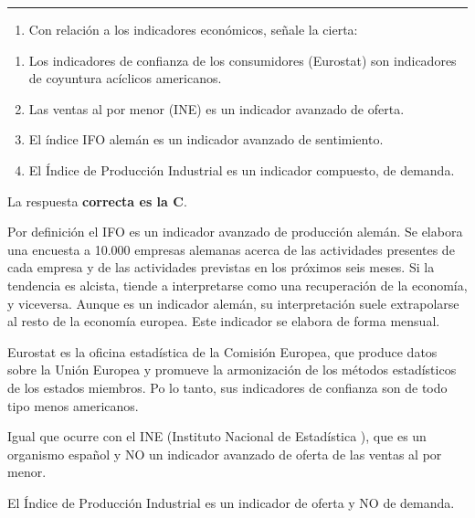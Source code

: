 \documentclass[
  letterpaper,
  DIV=11,
  numbers=noendperiod]{scrreprt}
\providecommand{\tightlist}{%
  \setlength{\itemsep}{0pt}\setlength{\parskip}{0pt}}\usepackage{longtable,booktabs,array}
\begin{document}
\begin{center}\rule{0.5\linewidth}{0.5pt}\end{center}

\begin{enumerate}
\def\labelenumi{\arabic{enumi}.}
\setcounter{enumi}{45}
\tightlist
\item
  Con relación a los indicadores económicos, señale la cierta:
\end{enumerate}

\begin{enumerate}
\def\labelenumi{\alph{enumi})}
\item
  Los indicadores de confianza de los consumidores (Eurostat) son
  indicadores de coyuntura acíclicos americanos.
\item
  Las ventas al por menor (INE) es un indicador avanzado de oferta.
\item
  El índice IFO alemán es un indicador avanzado de sentimiento.
\item
  El Índice de Producción Industrial es un indicador compuesto, de
  demanda.
\end{enumerate}

\begin{tcolorbox}[enhanced jigsaw, left=2mm, opacityback=0, colback=white, breakable, arc=.35mm, bottomrule=.15mm, rightrule=.15mm, toprule=.15mm, leftrule=.75mm, colframe=quarto-callout-tip-color-frame]
\begin{minipage}[t]{5.5mm}
\textcolor{quarto-callout-tip-color}{\faLightbulb}
\end{minipage}%
\begin{minipage}[t]{\textwidth - 5.5mm}

La respuesta \textbf{correcta es la C}.

Por definición el IFO es un indicador avanzado de producción alemán. Se
elabora una encuesta a 10.000 empresas alemanas acerca de las
actividades presentes de cada empresa y de las actividades previstas en
los próximos seis meses. Si la tendencia es alcista, tiende a
interpretarse como una recuperación de la economía, y viceversa. Aunque
es un indicador alemán, su interpretación suele extrapolarse al resto de
la economía europea. Este indicador se elabora de forma mensual.

Eurostat es la oficina estadística de la Comisión Europea, que produce
datos sobre la Unión Europea y promueve la armonización de los métodos
estadísticos de los estados miembros. Po lo tanto, sus indicadores de
confianza son de todo tipo menos americanos.

Igual que ocurre con el INE (Instituto Nacional de Estadística ), que es
un organismo español y NO un indicador avanzado de oferta de las ventas
al por menor.

El Índice de Producción Industrial es un indicador de oferta y NO de
demanda.

\end{minipage}%
\end{tcolorbox}
\end{document}

